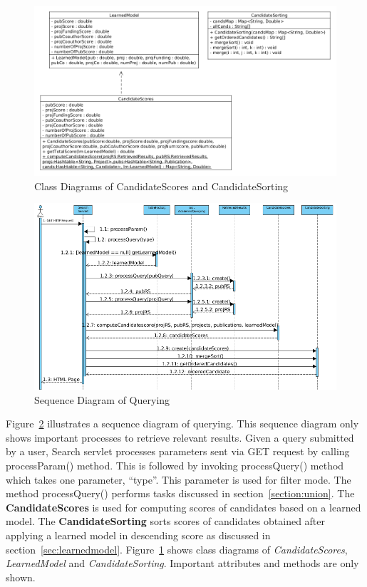 \begin{figure}
\centering
\includegraphics[scale=0.5]{./figures/score&sorting.png}
\caption{Class Diagrams of CandidateScores and CandidateSorting} \label{fig:scoreandsorting} 
\end{figure}

\begin{figure}
\centering
\includegraphics[scale=0.5]{./figures/searchsequence.png}
\caption{Sequence Diagram of Querying} \label{fig:searchsequence} 
\end{figure}

Figure~\ref{fig:searchsequence} illustrates a sequence diagram of querying. This sequence diagram only shows important processes to retrieve
relevant results. Given a query submitted by a user, Search servlet processes parameters sent via GET request by calling processParam() method. This is
followed by invoking processQuery() method which takes one parameter, ``type''. This parameter is used for filter mode. The method processQuery() 
performs tasks discussed in section~\ref{section:union}.
The \textbf{CandidateScores} is used for computing scores of candidates based on a learned model. The \textbf{CandidateSorting}
sorts scores of candidates obtained after applying a learned model in descending score as discussed in section~\ref{sec:learnedmodel}.
Figure~\ref{fig:scoreandsorting} shows class diagrams of \textit{CandidateScores}, \textit{LearnedModel} and \textit{CandidateSorting}.
Important attributes and methods are only shown.


